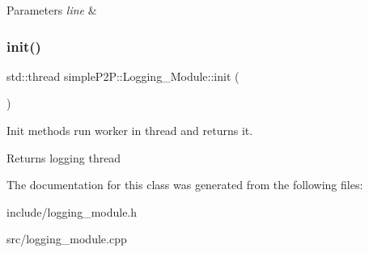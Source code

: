 \begin{DoxyParams}{Parameters}
{\em line} & \\
\hline
\end{DoxyParams}
\mbox{\label{classsimpleP2P_1_1Logging__Module_a57e92e151320fd7c811689d831498b6a}} 
\subsubsection{\texorpdfstring{init()}{init()}}
{\footnotesize\ttfamily std\+::thread simple\+P2\+P\+::\+Logging\+\_\+\+Module\+::init (\begin{DoxyParamCaption}{ }\end{DoxyParamCaption})}



Init methods run worker in thread and returns it. 

\begin{DoxyReturn}{Returns}
logging thread 
\end{DoxyReturn}


The documentation for this class was generated from the following files\+:\begin{DoxyCompactItemize}
\item 
include/logging\+\_\+module.\+h\item 
src/logging\+\_\+module.\+cpp\end{DoxyCompactItemize}
